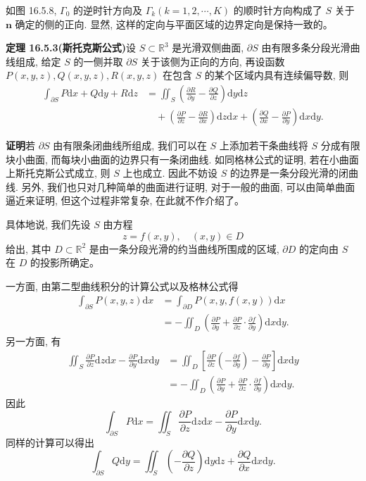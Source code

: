 \documentclass[UTF8, 12pt, fontset=fandol, oneside]{ctexart}
\begin{document}
如图 16.5.8, $\Gamma_0$ 的逆时针方向及 $\Gamma_k(k=1,2,\cdots,K)$ 的顺时针方向构成了 $S$ 关于 $\boldsymbol n$ 确定的侧的正向. 显然, 这样的定向与平面区域的边界定向是保持一致的。

\noindent\textbf{定理 16.5.3(斯托克斯公式)}\quad 设 $S\subset\mathbb R^3$ 是光滑双侧曲面, $\partial S$ 由有限多条分段光滑曲线组成, 给定 $S$ 的一侧并取 $\partial S$ 关于该侧为正向的方向, 再设函数 $P(x,y,z),Q(x,y,z),R(x,y,z)$ 在包含 $S$ 的某个区域内具有连续偏导数, 则
\[
\begin{aligned}
  \int_{\partial S}P\mathrm dx+Q\mathrm dy+R\mathrm dz
  &=\iint_S\left(\frac{\partial R}{\partial y}-\frac{\partial Q}{\partial z}\right)\mathrm dy\mathrm dz\\
  &\quad+\left(\frac{\partial P}{\partial z}-\frac{\partial R}{\partial x}\right)\mathrm dz\mathrm dx
    +\left(\frac{\partial Q}{\partial x}-\frac{\partial P}{\partial y}\right)\mathrm dx\mathrm dy.
\end{aligned}
\]

\noindent\textbf{证明}\quad 若 $\partial S$ 由有限条闭曲线所组成, 我们可以在 $S$ 上添加若干条曲线将 $S$ 分成有限块小曲面, 而每块小曲面的边界只有一条闭曲线. 如同格林公式的证明, 若在小曲面上斯托克斯公式成立, 则 $S$ 上也成立. 因此不妨设 $S$ 的边界是一条分段光滑的闭曲线. 另外, 我们也只对几种简单的曲面进行证明, 对于一般的曲面, 可以由简单曲面逼近来证明, 但这个过程非常复杂, 在此就不作介绍了。

具体地说, 我们先设 $S$ 由方程
\begin{equation}
  z=f(x,y),\quad (x,y)\in D
  \tag{16.5.1}
\end{equation}
给出, 其中 $D\subset\mathbb R^2$ 是由一条分段光滑的约当曲线所围成的区域, $\partial D$ 的定向由 $S$ 在 $D$ 的投影所确定。

一方面, 由第二型曲线积分的计算公式以及格林公式得
\[
\begin{aligned}
  \int_{\partial S}P(x,y,z)\mathrm dx
  &=\int_{\partial D}P(x,y,f(x,y))\mathrm dx\\
  &=-\iint_D\left(\frac{\partial P}{\partial y}
    +\frac{\partial P}{\partial z}\cdot\frac{\partial f}{\partial y}\right)\mathrm dx\mathrm dy.
\end{aligned}
\]
另一方面, 有
\[
\begin{aligned}
  \iint_S\frac{\partial P}{\partial z}\mathrm dz\mathrm dx
  -\frac{\partial P}{\partial y}\mathrm dx\mathrm dy
  &=\iint_D\left[\frac{\partial P}{\partial z}\left(-\frac{\partial f}{\partial y}\right)
    -\frac{\partial P}{\partial y}\right]\mathrm dx\mathrm dy\\
  &=-\iint_D\left(\frac{\partial P}{\partial y}
    +\frac{\partial P}{\partial z}\cdot\frac{\partial f}{\partial y}\right)\mathrm dx\mathrm dy.
\end{aligned}
\]
因此
\[
  \int_{\partial S}P\mathrm dx
  =\iint_S\frac{\partial P}{\partial z}\mathrm dz\mathrm dx
    -\frac{\partial P}{\partial y}\mathrm dx\mathrm dy.
\]
同样的计算可以得出
\[
  \int_{\partial S}Q\mathrm dy
  =\iint_S\left(-\frac{\partial Q}{\partial z}\right)\mathrm dy\mathrm dz
    +\frac{\partial Q}{\partial x}\mathrm dx\mathrm dy.
\]
\end{document}
